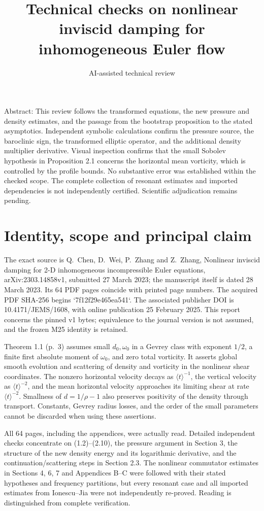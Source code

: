 \documentclass[10pt]{article}
\title{Technical checks on nonlinear inviscid damping for inhomogeneous Euler flow}
\author{AI-assisted technical review}
\date{}
\begin{document}
\maketitle
Abstract: This review follows the transformed equations, the new pressure and density estimates, and the passage from the bootstrap proposition to the stated asymptotics. Independent symbolic calculations confirm the pressure source, the baroclinic sign, the transformed elliptic operator, and the additional density multiplier derivative. Visual inspection confirms that the small Sobolev hypothesis in Proposition 2.1 concerns the horizontal mean vorticity, which is controlled by the profile bounds. No substantive error was established within the checked scope. The complete collection of resonant estimates and imported dependencies is not independently certified. Scientific adjudication remains pending.\par
\section*{Identity, scope and principal claim}
The exact source is Q. Chen, D. Wei, P. Zhang and Z. Zhang, Nonlinear inviscid damping for 2-D inhomogeneous incompressible Euler equations, arXiv:2303.14858v1, submitted 27 March 2023; the manuscript itself is dated 28 March 2023. Its 64 PDF pages coincide with printed page numbers. The acquired PDF SHA-256 begins `7f12f29e465ea541`. The associated publisher DOI is 10.4171/JEMS/1608, with online publication 25 February 2025. This report concerns the pinned v1 bytes; equivalence to the journal version is not assumed, and the frozen M25 identity is retained.\par
Theorem 1.1 (p. 3) assumes small \(d_0,\omega_0\) in a Gevrey class with exponent \(1/2\), a finite first absolute moment of \(\omega_0\), and zero total vorticity. It asserts global smooth evolution and scattering of density and vorticity in the nonlinear shear coordinates. The nonzero horizontal velocity decays as \(\langle t\rangle^{-1}\), the vertical velocity as \(\langle t\rangle^{-2}\), and the mean horizontal velocity approaches its limiting shear at rate \(\langle t\rangle^{-2}\). Smallness of \(d=1/\rho-1\) also preserves positivity of the density through transport. Constants, Gevrey radius losses, and the order of the small parameters cannot be discarded when using these assertions.\par
All 64 pages, including the appendices, were actually read. Detailed independent checks concentrate on (1.2)–(2.10), the pressure argument in Section 3, the structure of the new density energy and its logarithmic derivative, and the continuation/scattering steps in Section 2.3. The nonlinear commutator estimates in Sections 4, 6, 7 and Appendices B–C were followed with their stated hypotheses and frequency partitions, but every resonant case and all imported estimates from Ionescu–Jia were not independently re-proved. Reading is distinguished from complete verification.\par
\end{document}
